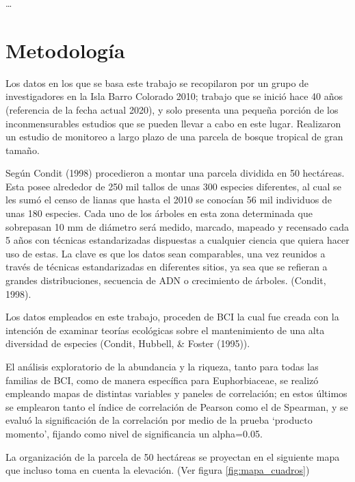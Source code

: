 \documentclass[11pt,]{article}
\begin{document}
\ldots

\section{Metodología}\label{metodologuxeda}

Los datos en los que se basa este trabajo se recopilaron por un grupo de
investigadores en la Isla Barro Colorado 2010; trabajo que se inició
hace 40 años (referencia de la fecha actual 2020), y solo presenta una
pequeña porción de los inconmensurables estudios que se pueden llevar a
cabo en este lugar. Realizaron un estudio de monitoreo a largo plazo de
una parcela de bosque tropical de gran tamaño.

Según Condit (1998) procedieron a montar una parcela dividida en 50
hectáreas. Esta posee alrededor de 250 mil tallos de unas 300 especies
diferentes, al cual se les sumó el censo de lianas que hasta el 2010 se
conocían 56 mil individuos de unas 180 especies. Cada uno de los árboles
en esta zona determinada que sobrepasan 10 mm de diámetro será medido,
marcado, mapeado y recensado cada 5 años con técnicas estandarizadas
dispuestas a cualquier ciencia que quiera hacer uso de estas. La clave
es que los datos sean comparables, una vez reunidos a través de técnicas
estandarizadas en diferentes sitios, ya sea que se refieran a grandes
distribuciones, secuencia de ADN o crecimiento de árboles. (Condit,
1998).

Los datos empleados en este trabajo, proceden de BCI la cual fue creada
con la intención de examinar teorías ecológicas sobre el mantenimiento
de una alta diversidad de especies (Condit, Hubbell, \& Foster (1995)).

El análisis exploratorio de la abundancia y la riqueza, tanto para todas
las familias de BCI, como de manera específica para Euphorbiaceae, se
realizó empleando mapas de distintas variables y paneles de correlación;
en estos últimos se emplearon tanto el índice de correlación de Pearson
como el de Spearman, y se evaluó la significación de la correlación por
medio de la prueba `producto momento', fijando como nivel de
significancia un alpha=0.05.

La organización de la parcela de 50 hectáreas se proyectan en el
siguiente mapa que incluso toma en cuenta la elevación. (Ver figura
\ref{fig:mapa_cuadros})
\end{document}
